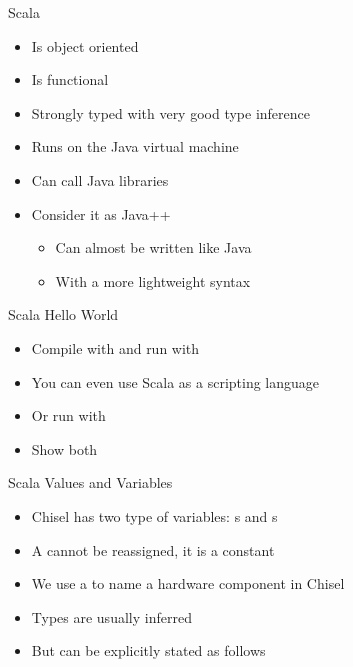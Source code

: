 \begin{frame}[fragile]{Scala}
\begin{itemize}
\item Is object oriented
\item Is functional
\item Strongly typed with very good type inference
\item Runs on the Java virtual machine
\item Can call Java libraries
\item Consider it as Java++
\begin{itemize}
\item Can almost be written like Java
\item With a more lightweight syntax
\end{itemize}
\end{itemize}
\end{frame}

\begin{frame}[fragile]{Scala Hello World}
\begin{itemize}
\item Compile with  and run with 
\item You can even use Scala as a scripting language
\item Or run with 
\item Show both
\end{itemize}
\end{frame}

\begin{frame}[fragile]{Scala Values and Variables}
\begin{itemize}
\item Chisel has two type of variables: s and s
\item A  cannot be reassigned, it is a constant
\item We use a  to name a hardware component in Chisel
\end{itemize}
\begin{itemize}
\item Types are usually inferred
\item But can be explicitly stated as follows
\end{itemize}
\end{frame}

